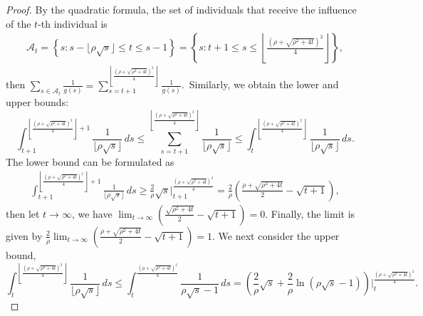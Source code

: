 \documentclass[12pt]{article}
\begin{document}
\begin{proof}
\noindent
By the quadratic formula, the set of individuals that receive the influence of the $t$-th individual is
{\small
\begin{align*}
    \mathcal{A}_t =\left\{s: s-\lfloor \rho \sqrt{s} \rfloor \le t \le s-1 \right\} = \left\{s: t+1 \le s \le   \left\lfloor \frac{(\rho+\sqrt{\rho^2+4t})^2}{4}\right\rfloor \right\},
\end{align*}
}
then $\sum_{s\in \mathcal{A}_t} \frac{1}{g(s)} =\sum_{s=t+1}^{\left\lfloor \frac{(\rho+\sqrt{\rho^2 + 4t})^2}{4}\right\rfloor} \frac{1}{g(s)}$.\
Similarly, we obtain the lower and upper bounds:
\[
\int_{t+1}^{\left\lfloor \frac{(\rho+\sqrt{\rho^2 + 4t})^2}{4}\right\rfloor+1}\frac{1} {\lfloor \rho \sqrt{s}\rfloor}\,ds \le \sum_{s=t+1}^{\left\lfloor \frac{(\rho+\sqrt{\rho^2 + 4t})^2}{4}\right\rfloor} \frac{1}{\lfloor \rho \sqrt{s} \rfloor} \le \int_t^{\left\lfloor \frac{(\rho+\sqrt{\rho^2 + 4t})^2}{4}\right\rfloor}\frac{1} {\lfloor \rho \sqrt{s} \rfloor}\,ds.
\]
The lower bound can be formulated as
\begin{eqnarray*}
\int_{t+1}^{\left\lfloor \frac{(\rho+\sqrt{\rho^2 + 4t})^2}{4}\right\rfloor+1}\frac{1} {\lfloor \rho \sqrt{s}\rfloor}\,ds \ge \frac{2}{\rho}\sqrt{s} \Big|_{t+1}^{\frac{(\rho+\sqrt{\rho^2 + 4t})^2}{4}} = \frac{2}{\rho}\left(\frac{\rho+\sqrt{\rho^2+4t}}{2} - \sqrt{t+1} \right),
\end{eqnarray*}
then let $t \to \infty$, we have $\lim_{t \to \infty}\left(\frac{\sqrt{\rho^2+4t}}{2} - \sqrt{t+1} \right)=0$.
Finally, the limit is given by $\frac{2}{\rho} \lim_{t \to \infty}\left(\frac{\rho+\sqrt{\rho^2+4t}}{2} - \sqrt{t+1} \right)= 1$.
We next consider the upper bound,
\[
\int_t^{\left\lfloor \frac{(\rho+\sqrt{\rho^2 + 4t})^2}{4}\right\rfloor}\frac{1} {\lfloor \rho \sqrt{s} \rfloor}\,ds \le \int_t^{\frac{(\rho+\sqrt{\rho^2 + 4t})^2}{4}}\frac{1} {\rho \sqrt{s}-1}\,ds = 
\left( \frac{2}{\rho}\sqrt{s}+\frac{2}{\rho}\ln{(\rho\sqrt{s}-1)} \right) \Big|_{t}^{\frac{(\rho+\sqrt{\rho^2 + 4t})^2}{4}}.
\]
\end{proof}
\end{document}
